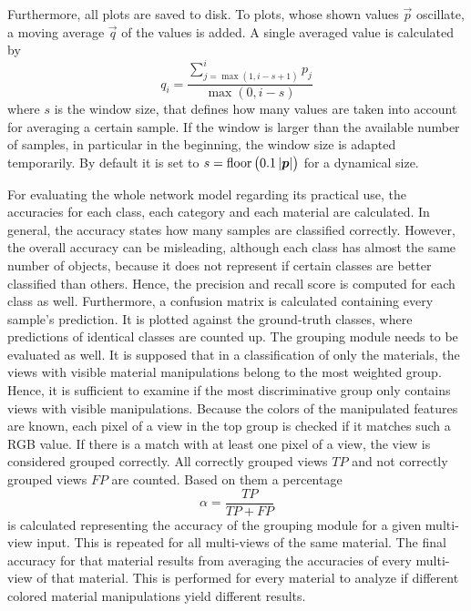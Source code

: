 Furthermore, all plots are saved to disk.
To plots, whose shown values $\vec{p}$ oscillate, a moving average $\vec{q}$ of the values is added.
A single averaged value is calculated by
\begin{equation}
	q_i = \frac{\sum_{j = \max(1,i-s+1)}^{i} p_j}{\max(0,i-s)}
\end{equation}
where $s$ is the window size, that defines how many values are taken into account for averaging a certain sample.
If the window is larger than the available number of samples, in particular in the beginning, the window size is adapted temporarily.
By default it is set to $s=\operatorname{floor}\left( 0.1 \left| \bm{p} \right| \right)$ for a dynamical size.

For evaluating the whole network model regarding its practical use, the accuracies for each class, each category and each material are calculated.
In general, the accuracy states how many samples are classified correctly.
However, the overall accuracy can be misleading, although each class has almost the same number of objects, because it does not represent if certain classes are better classified than others.
Hence, the precision and recall score is computed for each class as well.
Furthermore, a confusion matrix is calculated containing every sample's prediction.
It is plotted against the ground-truth classes, where predictions of identical classes are counted up.
The grouping module needs to be evaluated as well.
It is supposed that in a classification of only the materials, the views with visible material manipulations belong to the most weighted group.
Hence, it is sufficient to examine if the most discriminative group only contains views with visible manipulations.
Because the colors of the manipulated features are known, each pixel of a view in the top group is checked if it matches such a RGB value.
If there is a match with at least one pixel of a view, the view is considered grouped correctly.
All correctly grouped views $TP$ and not correctly grouped views $FP$ are counted.
Based on them a percentage
\begin{equation}
	\label{eq:metric-group}
	\alpha = \frac{TP}{TP + FP}
\end{equation}
is calculated representing the accuracy of the grouping module for a given multi-view input.
This is repeated for all multi-views of the same material.
The final accuracy for that material results from averaging the accuracies of every multi-view of that material.
This is performed for every material to analyze if different colored material manipulations yield different results. 

